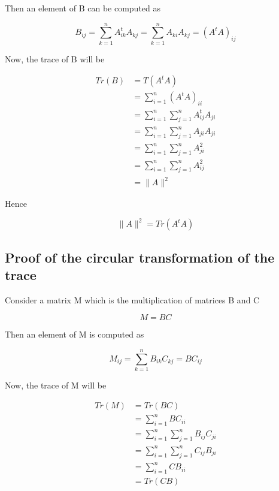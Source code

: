 \documentclass{article}
\begin{document}
    Then an element of B can be computed as

    \begin{equation*}
        B_{ij} = \sum_{k=1}^n A_{ik}^t A_{kj} = \sum_{k=1}^n A_{ki} A_{kj} = (A^tA)_{ij}
    \end{equation*}

    Now, the trace of B will be

    \begin{equation*}
        \begin{aligned}
            Tr(B) &= T(A^tA)\\
                  &= \sum_{i=1}^n (A^tA)_{ii}\\
                  &= \sum_{i=1}^n \sum_{j=1}^n A_{ij}^t A_{ji}\\
                  &= \sum_{i=1}^n \sum_{j=1}^n A_{ji} A_{ji}\\
                  &= \sum_{i=1}^n \sum_{j=1}^n A_{ji}^2 \\
                  &= \sum_{i=1}^n \sum_{j=1}^n A_{ij}^2 \\
                  &= \lVert A \rVert^2
        \end{aligned}
    \end{equation*}

    Hence

    \begin{equation*}
        \lVert A \rVert^2 = Tr(A^tA)
    \end{equation*}

    \subsection{Proof of the circular transformation of the trace} \label{circular_trace}

    Consider a matrix M which is the multiplication of matrices B and C

    \begin{equation*}
        M = BC
    \end{equation*}

    Then an element of M is computed as

    \begin{equation*}
        M_{ij} = \sum_{k=1}^n B_{ik} C_{kj} = BC_{ij}
    \end{equation*}

    Now, the trace of M will be

    \begin{equation*}
        \begin{aligned}
            Tr(M) &= Tr(BC)\\
                  &= \sum_{i=1}^n BC_{ii}\\
                  &= \sum_{i=1}^n \sum_{j=1}^n B_{ij} C_{ji}\\
                  &= \sum_{i=1}^n \sum_{j=1}^n C_{ij} B_{ji}\\
                  &= \sum_{i=1}^n CB_{ii}\\
                  &= Tr(CB)
        \end{aligned}
    \end{equation*}
\end{document}
